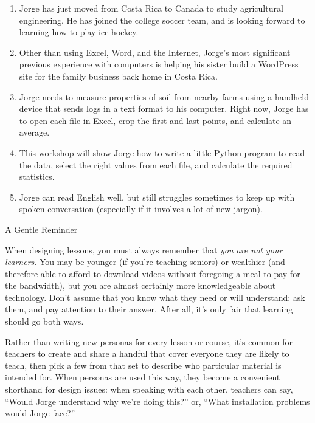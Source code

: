 \begin{enumerate}

\item
  Jorge has just moved from Costa Rica to Canada to study agricultural
  engineering. He has joined the college soccer team, and is looking
  forward to learning how to play ice hockey.

\item
  Other than using Excel, Word, and the Internet, Jorge's most
  significant previous experience with computers is helping his sister
  build a WordPress site for the family business back home in Costa
  Rica.

\item
  Jorge needs to measure properties of soil from nearby farms using a
  handheld device that sends logs in a text format to his computer.
  Right now, Jorge has to open each file in Excel, crop the first and
  last points, and calculate an average.

\item
  This workshop will show Jorge how to write a little Python program to
  read the data, select the right values from each file, and calculate
  the required statistics.

\item
  Jorge can read English well, but still struggles sometimes to keep
  up with spoken conversation (especially if it involves a lot of new
  jargon).

\end{enumerate}

\begin{callout}{A Gentle Reminder}

  When designing lessons, you must always remember that \emph{you are
    not your learners}. You may be younger (if you're teaching
  seniors) or wealthier (and therefore able to afford to download
  videos without foregoing a meal to pay for the bandwidth), but you
  are almost certainly more knowledgeable about technology. Don't
  assume that you know what they need or will understand: ask them,
  and pay attention to their answer. After all, it's only fair that
  learning should go both ways.

\end{callout}

Rather than writing new personas for every lesson or course, it's
common for teachers to create and share a handful that cover everyone
they are likely to teach, then pick a few from that set to describe
who particular material is intended for.  When personas are used this
way, they become a convenient shorthand for design issues: when
speaking with each other, teachers can say, ``Would Jorge understand
why we're doing this?'' or, ``What installation problems would Jorge
face?''

